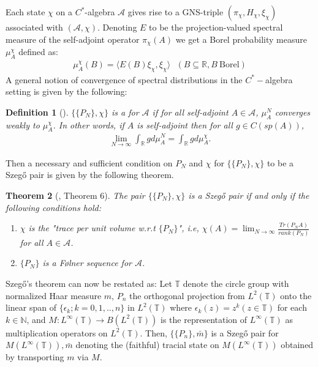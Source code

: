 \documentclass[article]{amsart}
\newtheorem{theorem}            {Theorem}[section]
\newtheorem{definition}[theorem]{Definition}
\begin{document}
 Each state $\chi$ on a $C^*$-algebra $\mathcal{A}$ gives rise to a GNS-triple $(\pi_{\chi}, H_{\chi}, \xi_{\chi})$ associated with $(\mathcal{A}, \chi)$. Denoting $E$ to be the projection-valued spectral measure of the self-adjoint operator $\pi_{\chi}(A)$ we get a Borel probability measure $\mu_A^{\chi}$ defined as:
\begin{align*}
    \mu_A^{\chi}(B) = \langle E(B) \xi_{\chi}, \xi_{\chi} \rangle \ \ \ (B \subseteq \mathbb{R}, B \ \text{Borel})
\end{align*}
A general notion of convergence of spectral distributions in the $C^*-$algebra setting is given by the following:
\begin{definition} [\cite{MR1458766}]
   $\{\{P_N\}, \chi\}$ is a  for $\mathcal{A}$ if for all self-adjoint $A \in \mathcal{A}$, $\mu_A^N$ converges weakly to $\mu_A^{\chi}$. In other words, if $A$ is self-adjoint then for all $g \in C(sp(A))$,
\begin{align*}
\lim_{N \rightarrow \infty} \int_{\mathbb{R}} g d \mu_{A}^N = \int_{\mathbb{R}} g d \mu_{A}^{\chi}.
\end{align*} 
\end{definition}


Then a necessary and sufficient condition on $P_N$ and $\chi$ for $\{\{P_N\}, \chi\}$ to be a Szeg\H{o} pair is given by the following theorem. 
\begin{theorem}[\cite{MR1458766}, Theorem 6] \label{eq20}
    The pair $\{\{P_N\}, \chi \}$ is a Szeg\H{o} pair if and only if the following conditions hold:
    \begin{enumerate}[label=(\alph*)]
    \item $\chi$ is the "trace per unit volume w.r.t $\{P_N\}$", i.e, $\chi(A) = \lim_{N \rightarrow \infty} \frac{Tr(P_N A)}{rank(P_N)}$ for all $A \in \mathcal{A}$.
    \item $\{P_N\}$ is a Følner sequence for $\mathcal{A}$.
    \end{enumerate}
\end{theorem}

Szeg\H{o}'s theorem can now be restated as:
Let $\mathbb{T}$ denote the circle group with normalized Haar measure $m$, $P_n$ the orthogonal projection from $L^2(\mathbb{T})$ onto the linear span of $\{\epsilon_k; k =0,1,..,n\}$ in $L^2(\mathbb{T})$ where $\epsilon_k(z) = z^k (z \in \mathbb{T})$ for each $k \in \mathbb{N}$, and $M: L^{\infty}(\mathbb{T}) \rightarrow B(L^2(\mathbb{T}))$ is the representation of $L^{\infty}(\mathbb{T})$ as multiplication operators on $L^2(\mathbb{T})$. Then, $\{\{P_n\}, \bar{m}\}$ is a Szeg\H{o} pair for $M(L^{\infty}(\mathbb{T})), \bar{m}$ denoting the (faithful) tracial state on $M(L^{\infty}(\mathbb{T}))$ obtained by transporting $m$ via $M$.\\
\end{document}
